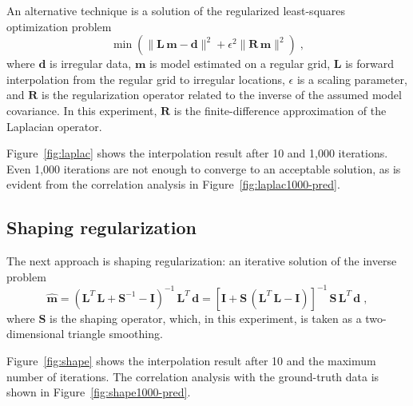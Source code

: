 An alternative technique is a solution of the regularized
least-squares optimization problem
\begin{equation}
\label{eq:laplace}
\min\left( \|\mathbf{L}\,\mathbf{m} - \mathbf{d}\|^2 + \epsilon^2 \|\mathbf{R}\,\mathbf{m}\|^2\right)\;,
\end{equation}
where $\mathbf{d}$ is irregular data, $\mathbf{m}$ is model estimated
on a regular grid, $\mathbf{L}$ is forward interpolation from the
regular grid to irregular locations, $\epsilon$ is a scaling
parameter, and $\mathbf{R}$ is the regularization operator related to
the inverse of the assumed model covariance. In this experiment,
$\mathbf{R}$ is the finite-difference approximation of the Laplacian operator.


Figure~\ref{fig:laplac} shows the interpolation result after 10 and
1,000 iterations. Even 1,000 iterations are not enough to converge to
an acceptable solution, as is evident from the correlation analysis in
Figure~\ref{fig:laplac1000-pred}.


\subsection{Shaping regularization}

The next approach is shaping regularization: an iterative solution of the inverse problem
\begin{equation}
\widehat{\mathbf{m}} = 
  \left(\mathbf{L}^T\,\mathbf{L} + \mathbf{S}^{-1} -
    \mathbf{I}\right)^{-1}\,\mathbf{L}^T\,\mathbf{d}
  = \left[\mathbf{I} + 
    \mathbf{S}\,\left(\mathbf{L}^T\,\mathbf{L} - \mathbf{I}\right)\right]^{-1}\,
  \mathbf{S}\,\mathbf{L}^T\,\mathbf{d}\;,
  \label{eqn:shape}  
\end{equation}
where $\mathbf{S}$ is the shaping operator, which, in this experiment,
is taken as a two-dimensional triangle smoothing.


Figure~\ref{fig:shape} shows the interpolation result after 10 and the
maximum number of iterations. The correlation analysis with the
ground-truth data is shown in Figure~\ref{fig:shape1000-pred}.

